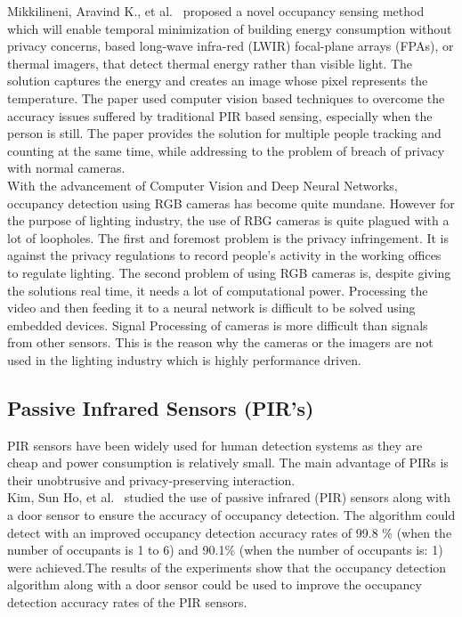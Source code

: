 Mikkilineni, Aravind K., et al.~\cite{mikkilineni2019novel} proposed a novel occupancy sensing method which will enable temporal minimization of building energy consumption without privacy concerns, based long-wave infra-red (LWIR) focal-plane arrays (FPAs), or thermal imagers, that detect thermal energy rather than visible light. The solution captures the energy and creates an image whose pixel represents the temperature.  The paper used computer vision based techniques to overcome the accuracy issues suffered by traditional PIR based sensing, especially when the person is still. The paper provides the solution for multiple people tracking and counting at the same time, while addressing to the problem of breach of privacy with normal cameras.
\\

With the advancement of Computer Vision and Deep Neural Networks, occupancy detection using RGB cameras has become quite mundane. However for the purpose of lighting industry, the use of RBG cameras is quite plagued with a lot of loopholes. The first and foremost problem is the privacy infringement. It is against the privacy regulations to record people's activity in the working offices to regulate lighting. The second problem of using RGB cameras is, despite giving the solutions real time, it needs a lot of computational power. Processing the video and then feeding it to a neural network is difficult to be solved using embedded devices. Signal Processing of cameras is more difficult than signals from other sensors.  This is the reason why the cameras or the imagers are not used in the lighting industry which is highly performance driven. 


\subsection{Passive Infrared Sensors (PIR's)}
PIR sensors have been widely used for human detection systems as they are cheap and power consumption is relatively small. The main advantage of PIRs is their unobtrusive and privacy-preserving interaction.
\\

Kim, Sun Ho, et al.~\cite{kim2017improved} studied the use of passive infrared (PIR) sensors along with a door sensor to ensure the accuracy of occupancy detection. The algorithm could detect with an improved occupancy detection accuracy rates of 99.8 \% (when the number of occupants is 1 to 6) and 90.1\% (when the number of occupants is: 1) were achieved.The results of the experiments show that the occupancy detection algorithm along with a door sensor could be used to improve the occupancy detection accuracy rates of
the PIR sensors.
\\
	
